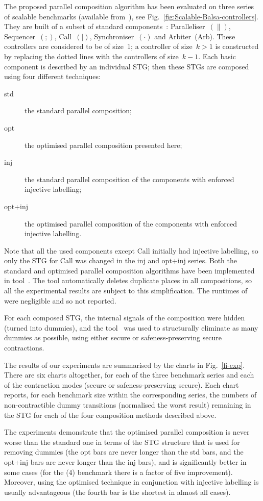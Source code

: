 The proposed parallel composition algorithm has been evaluated
on three series of scalable benchmarks (available
from~\cite{pcomp}), see
Fig.~\ref{fig:Scalable-Balsa-controllers}. They are built of a
subset of standard \balsa components~\cite{EB-02}:
Paralleliser~$(\parallel)$, Sequencer~$(;)$, Call~$(|)$,
Synchroniser~$(\cdot)$ and Arbiter~(Arb). These controllers are
considered to be of size~1; a controller of size~$k>1$ is
constructed by replacing the dotted lines with the controllers
of size~$k-1$. Each basic component is described by an
individual STG; then these STGs are composed using four
different techniques:
\begin{description}
  \item[std] the standard parallel composition;
  \item[opt] the optimised parallel composition presented
      here;
  \item[inj] the standard parallel composition of the
      components with enforced injective labelling;
  \item[opt+inj] the optimised parallel composition of the
      components with enforced injective labelling.
\end{description}
Note that all the used \balsa components except Call initially
had injective labelling, so only the STG for Call was changed
in the inj and opt+inj series. Both the standard and optimised
parallel composition algorithms have been implemented in \pcomp
tool~\cite{pcomp}. The tool automatically deletes duplicate
places in all compositions, so all the experimental results are
subject to this simplification. The runtimes of \pcomp were
negligible and so not reported.

For each composed STG, the internal signals of the composition
were hidden (\ie turned into dummies), and the \desij
tool~\cite{Sch07} was used to structurally eliminate as many
dummies as possible, using either secure or safeness-preserving
secure contractions.

The results of our experiments are summarised by the charts in
Fig.~\ref{fi-exp}. There are six charts altogether, for each of
the three benchmark series and each of the contraction modes
(secure or safeness-preserving secure). Each chart reports, for
each benchmark size within the corresponding series, the
numbers of non-con\-trac\-tible dummy transitions (normalised
\wrt the worst result) remaining in the STG for each of the
four composition methods described above.

The experiments demonstrate that the optimised parallel
composition is never worse than the standard one in terms of
the STG structure that is used for removing dummies (the opt
bars are never longer than the std bars, and the opt+inj bars
are never longer than the inj bars), and is significantly
better in some cases (\eg for the \SeqCallParSync(4) benchmark
there is a factor of five improvement). Moreover, using the
optimised technique in conjunction with injective labelling is
usually advantageous (the fourth bar is the shortest in almost
all cases).

